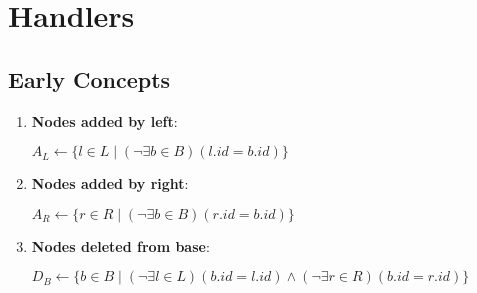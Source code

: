 \documentclass[a4paper]{article}
\begin{document}
    

    \section{Handlers}

    \subsection{Early Concepts}

    \begin{enumerate}
        \item \textbf{Nodes added by left}:
        
        $A_L \leftarrow \{l \in L \mid (\lnot \exists b \in B)(l.id = b.id)\}$\;

        \item \textbf{Nodes added by right}:
        
        $A_R \leftarrow \{r \in R \mid (\lnot \exists b \in B)(r.id = b.id)\}$\;

        \item \textbf{Nodes deleted from base}:
        
        $D_B \leftarrow \{b \in B \mid (\lnot \exists l \in L)(b.id = l.id) \land (\lnot \exists r \in R)(b.id = r.id)\}$\;
    \end{enumerate}

    
    
    
\end{document}
